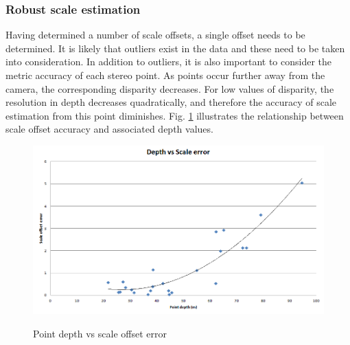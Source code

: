 \subsubsection{Robust scale estimation}

Having determined a number of scale offsets, a single offset needs to be determined.  It is likely that outliers exist in the data and these need to be taken into consideration.  In addition to outliers, it is also important to consider the metric accuracy of each stereo point.  As points occur further away from the camera, the corresponding disparity decreases.  For low values of disparity, the resolution in depth decreases quadratically, and therefore the accuracy of scale estimation from this point diminishes. Fig. \ref{fig:scale_bar_graph} illustrates the relationship between scale offset accuracy and associated depth values.
\begin{figure}[h]
  \centering
    \includegraphics[width=1.0\textwidth]{chapters/images/distance_vs_scale_error}\\
  \caption{Point depth vs scale offset error}
  \label{fig:scale_bar_graph}
\end{figure}


